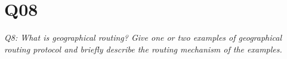 \chapter{Q08}
\emph{Q8: What is geographical routing? Give one or two examples of
geographical routing protocol and briefly describe the routing mechanism of the
examples.}
